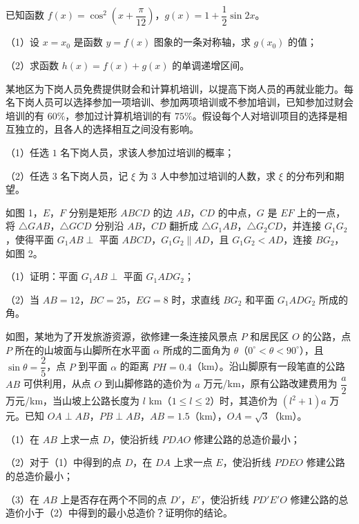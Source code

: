 \begin{question}
已知函数 $f(x)=\cos^2\left(x+\dfrac{\pi}{12}\right)$，$g(x)=1+\dfrac12\sin2x$。

（1）设 $x=x_0$ 是函数 $y=f(x)$ 图象的一条对称轴，求 $g(x_0)$ 的值；

（2）求函数 $h(x)=f(x)+g(x)$ 的单调递增区间。

\end{question}
\begingroup
\renewenvironment{question}{\Needspace{0.46\textheight}}{}
\begin{question}
某地区为下岗人员免费提供财会和计算机培训，以提高下岗人员的再就业能力。每名下岗人员可以选择参加一项培训、参加两项培训或不参加培训，已知参加过财会培训的有 $60\%$，参加过计算机培训的有 $75\%$。假设每个人对培训项目的选择是相互独立的，且各人的选择相互之间没有影响。

（1）任选 $1$ 名下岗人员，求该人参加过培训的概率；

（2）任选 $3$ 名下岗人员，记 $\xi$ 为 $3$ 人中参加过培训的人数，求 $\xi$ 的分布列和期望。

\Needspace{0.4\textheight}
\end{question}
\endgroup
\begingroup
\renewenvironment{question}{\Needspace{0.46\textheight}}{}
\begin{question}
如图 1，$E$，$F$ 分别是矩形 $ABCD$ 的边 $AB$，$CD$ 的中点，$G$ 是 $EF$ 上的一点，将 $\triangle GAB$，$\triangle GCD$ 分别沿 $AB$，$CD$ 翻折成 $\triangle G_1AB$，$\triangle G_2CD$，并连接 $G_1G_2$，使得平面 $G_1AB\perp$ 平面 $ABCD$，$G_1G_2\parallel AD$，且 $G_1G_2<AD$，连接 $BG_2$，如图 2。

（1）证明：平面 $G_1AB\perp$ 平面 $G_1ADG_2$；

（2）当 $AB=12$，$BC=25$，$EG=8$ 时，求直线 $BG_2$ 和平面 $G_1ADG_2$ 所成的角。
\nopagebreak[4]
\begin{center}\end{center}
\nopagebreak[4]
\Needspace{0.4\textheight}
\end{question}
\endgroup
\begin{question}
如图，某地为了开发旅游资源，欲修建一条连接风景点 $P$ 和居民区 $O$ 的公路，点 $P$ 所在的山坡面与山脚所在水平面 $\alpha$ 所成的二面角为 $\theta$（$0^\circ<\theta<90^\circ$），且 $\sin\theta=\dfrac25$，点 $P$ 到平面 $\alpha$ 的距离 $PH=0.4$（km）。沿山脚原有一段笔直的公路 $AB$ 可供利用，从点 $O$ 到山脚修路的造价为 $a$ 万元/km，原有公路改建费用为 $\dfrac a2$ 万元/km，当山坡上公路长度为 $l$ km（$1\leqslant l\leqslant2$）时，其造价为 $(l^2+1)a$ 万元。已知 $OA\perp AB$，$PB\perp AB$，$AB=1.5$（km），$OA=\sqrt3$（km）。

（1）在 $AB$ 上求一点 $D$，使沿折线 $PDAO$ 修建公路的总造价最小；

（2）对于（1）中得到的点 $D$，在 $DA$ 上求一点 $E$，使沿折线 $PDEO$ 修建公路的总造价最小；

（3）在 $AB$ 上是否存在两个不同的点 $D'$，$E'$，使沿折线 $PD'E'O$ 修建公路的总造价小于（2）中得到的最小总造价？证明你的结论。
\nopagebreak[4]
\begin{center}\end{center}
\nopagebreak[4]
\end{question}
